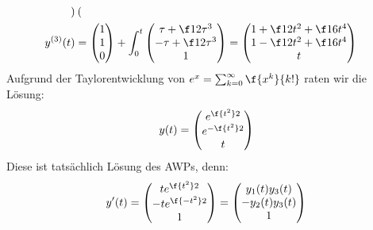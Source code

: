 \documentclass{mywork}
\begin{document}
\begin{aufgabe}
\begin{enumerate}[a)]
\begin{align*}
\begin{pmatrix}
				\end{pmatrix} \\
				y^{(3)}(t) &= \begin{pmatrix}
					1 \\ 1 \\ 0
				\end{pmatrix} + \int_0^t \begin{pmatrix}
					\tau + \f 12 \tau^3 \\ - \tau + \f 12 \tau^3 \\ 1
				\end{pmatrix} = \begin{pmatrix}
					1 + \f 12 t^2 + \f 16 t^4 \\ 1 - \f 12 t^2 + \f 16 t^4 \\ t
				\end{pmatrix}
			\end{align*}
			Aufgrund der Taylorentwicklung von $e^x = \sum_{k=0}^\infty \f {x^k}{k!}$ raten wir die Lösung:
			\[
				y(t) = \begin{pmatrix}
					e^{\f {t^2}2} \\ e^{- \f {t^2}2} \\ t
				\end{pmatrix}
			\]
			Diese ist tatsächlich Lösung des AWPs, denn:
			\[
				y'(t) = \begin{pmatrix}
					t e^{\f {t^2}2} \\
					-t e^{\f {-t^2}2} \\
					1
				\end{pmatrix} = \begin{pmatrix}
					y_1(t) y_3(t) \\
					-y_2(t) y_3(t) \\
					1
				\end{pmatrix}
			\]
	\end{enumerate}

\end{aufgabe}
\end{document}
